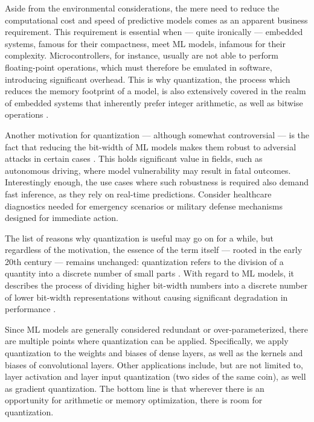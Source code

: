 Aside from the environmental considerations, the mere need to reduce 
the computational cost and speed of predictive models
comes as an apparent business requirement. 
This requirement is essential when — quite ironically — embedded systems, famous for their compactness, meet 
ML models, infamous for their complexity. Microcontrollers, for instance, 
usually are not able to perform floating-point operations, which must therefore be emulated in software, 
introducing significant overhead. This is why quantization, the process which reduces the memory footprint of a model,
is also extensively covered in the realm of embedded systems that 
inherently prefer integer arithmetic, as well as bitwise operations \cite{rastegari2016xnor} \cite{DBLP:conf/eccv/ZhangYYH18} \cite{DBLP:conf/codit/KhalifaM24}\cite{DBLP:journals/corr/abs-2105-13331}.

Another motivation for quantization — although somewhat controversial — is the fact that reducing the bit-width of
ML models makes them robust to adversial attacks in certain cases \cite{DBLP:journals/corr/abs-2404-05639}.
This holds significant value in fields, such as autonomous driving,
where model vulnerability may result in fatal outcomes.
Interestingly enough, the use cases where such robustness is required also demand fast inference, 
as they rely on real-time predictions. Consider healthcare diagnostics needed for emergency scenarios 
or military defense mechanisms designed for immediate action.

The list of reasons why quantization is useful may go on for a while, but regardless of the motivation,
the essence of the term itself — rooted in the early 20th century — remains unchanged:
quantization refers to the division of a quantity into a discrete number
of small parts \cite{gray1998quantization}. With regard to ML models, 
it describes the process of dividing higher bit-width numbers into a discrete number of lower bit-width representations
without causing significant degradation in performance \cite{gholami2021survey}.

Since ML models are generally considered redundant or over-parameterized,
there are multiple points where quantization can be applied.
Specifically, we apply quantization to the weights and biases of dense layers, 
as well as the kernels and biases of convolutional layers. 
Other applications include, but are not limited to, layer activation and layer input quantization (two sides of the same coin),
as well as gradient quantization. The bottom line is that wherever there is an opportunity for arithmetic or memory optimization,
there is room for quantization.

